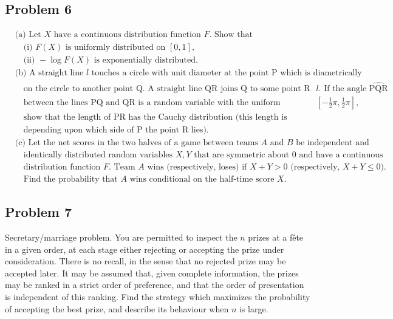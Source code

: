 \documentclass[letterpaper, 11pt]{article}
\newcommand{\1}{\mathds{1}}	%
\theoremstyle{definition}
\begin{document}
    \subsection*{Problem 6}
    \begin{align*}
        &\text{(a) Let } X \text{ have a continuous distribution function } F. \text{ Show that}\\
        &\quad \text{(i) } F(X) \text{ is uniformly distributed on } [0, 1],\\
        &\quad \text{(ii) } -\log F(X) \text{ is exponentially distributed.}\\
        &\text{(b) A straight line } l \text{ touches a circle with unit diameter at the point P which is diametrically opposed}\\
        &\quad \text{on the circle to another point Q. A straight line QR joins Q to some point R on } l. \text{ If the angle } \widehat{\text{PQR}}\\
        &\quad \text{between the lines PQ and QR is a random variable with the uniform distribution on } [-\frac{1}{2}\pi, \frac{1}{2}\pi],\\
        &\quad \text{show that the length of PR has the Cauchy distribution (this length is measured positive or negative}\\
        &\quad \text{depending upon which side of P the point R lies).}\\
        &\text{(c) Let the net scores in the two halves of a game between teams } A \text{ and } B \text{ be independent and}\\
        &\quad \text{identically distributed random variables } X, Y \text{ that are symmetric about 0 and have a continuous}\\
        &\quad \text{distribution function } F. \text{ Team } A \text{ wins (respectively, loses) if } X + Y > 0 \text{ (respectively, } X + Y \leq 0).\\
        &\quad \text{Find the probability that } A \text{ wins conditional on the half-time score } X.
        \end{align*}
    \subsection*{Problem 7}
    Secretary/marriage problem. You are permitted to inspect the $n$ prizes at a fête in a given order, at each stage either rejecting or accepting the prize under consideration. There is no recall, in the sense that no rejected prize may be accepted later. It may be assumed that, given complete information, the prizes may be ranked in a strict order of preference, and that the order of presentation is independent of this ranking. Find the strategy which maximizes the probability of accepting the best prize, and describe its behaviour when $n$ is large.
\end{document}
